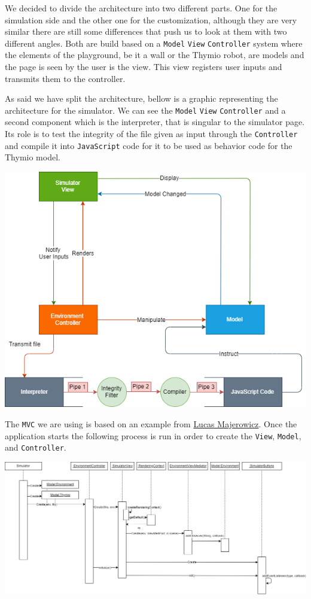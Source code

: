 \documentclass{scrbook}
\begin{document}
We decided to divide the architecture into two different parts. One for the simulation side and the other one for the customization, although they are very similar there are still some differences that push us to look at them with two different angles. Both are build based on a \texttt{Model} \texttt{View} \texttt{Controller} system where the elements of the playground, be it a wall or the Thymio robot, are models and the page is seen by the user is the view. This view registers user inputs and transmits them to the controller. 

As said we have split the architecture, bellow is a graphic representing the architecture for the simulator. We can see the \texttt{Model} \texttt{View} \texttt{Controller} and a second component which is the interpreter, 
that is singular to the simulator page. Its role is to test the integrity of the file given as input through the \texttt{Controller} and compile it into \texttt{JavaScript} code for it to be used as behavior code for the Thymio model.

\begin{center}
  \includegraphics[width=\textwidth]{./architecture_proposal-Page-1}
\end{center}

The \texttt{MVC} we are using is based on an example from \href{https://github.com/lucasmajerowicz/threejs-mvc-example}{Lucas Majerowicz}. Once the application starts the following process is run in order to create the \texttt{View}, \texttt{Model}, and \texttt{Controller}.
\begin{center}
  \includegraphics[width=\textwidth]{./start_app}
\end{center}
\end{document}
